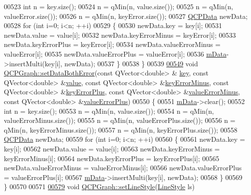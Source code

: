 \begin{DoxyCode}
00523   \textcolor{keywordtype}{int} n = key.size();
00524   n = qMin(n, value.size());
00525   n = qMin(n, valueError.size());
00526   n = qMin(n, keyError.size());
00527   \hyperlink{a00030_d2/d94/a00184}{QCPData} newData;
00528   \textcolor{keywordflow}{for} (\textcolor{keywordtype}{int} i=0; i<n; ++i)
00529   \{
00530     newData.key = key[i];
00531     newData.value = value[i];
00532     newData.keyErrorMinus = keyError[i];
00533     newData.keyErrorPlus = keyError[i];
00534     newData.valueErrorMinus = valueError[i];
00535     newData.valueErrorPlus = valueError[i];
00536     \hyperlink{a00031_a8457c840f69a0ac49f61d30a509c5d08}{mData}->insertMulti(key[i], newData);
00537   \}
00538 \}
00539 
\hypertarget{a00115_source_l00549}{}\hyperlink{a00031_abb75736ecdbf6e6a7501e1da64fb18cf}{00549} \textcolor{keywordtype}{void} \hyperlink{a00031_a873fe46bdb20be5710428e474ade8908}{QCPGraph::setDataBothError}(\textcolor{keyword}{const} QVector<double> &
      \hyperlink{a00116_a94bb892c30911cd62cba0707a5395be4}{key}, \textcolor{keyword}{const} QVector<double> &\hyperlink{a00116_aee90379adb0307effb138f4871edbc5c}{value}, \textcolor{keyword}{const} QVector<double> &\hyperlink{a00116_a7d90a6258f6d24ad254245076e5beac7}{keyErrorMinus}, \textcolor{keyword}{const} 
      QVector<double> &\hyperlink{a00116_a1d47938cd7209297ef861cf01816d89f}{keyErrorPlus}, \textcolor{keyword}{const} QVector<double> &\hyperlink{a00116_aea31bce613e569fc5e1888465c677909}{valueErrorMinus}, \textcolor{keyword}{const} 
      QVector<double> &\hyperlink{a00116_a6d93a38079a2b52118982e82673e87a3}{valueErrorPlus})
00550 \{
00551   \hyperlink{a00031_a8457c840f69a0ac49f61d30a509c5d08}{mData}->clear();
00552   \textcolor{keywordtype}{int} n = key.size();
00553   n = qMin(n, value.size());
00554   n = qMin(n, valueErrorMinus.size());
00555   n = qMin(n, valueErrorPlus.size());
00556   n = qMin(n, keyErrorMinus.size());
00557   n = qMin(n, keyErrorPlus.size());
00558   \hyperlink{a00030_d2/d94/a00184}{QCPData} newData;
00559   \textcolor{keywordflow}{for} (\textcolor{keywordtype}{int} i=0; i<n; ++i)
00560   \{
00561     newData.key = key[i];
00562     newData.value = value[i];
00563     newData.keyErrorMinus = keyErrorMinus[i];
00564     newData.keyErrorPlus = keyErrorPlus[i];
00565     newData.valueErrorMinus = valueErrorMinus[i];
00566     newData.valueErrorPlus = valueErrorPlus[i];
00567     \hyperlink{a00031_a8457c840f69a0ac49f61d30a509c5d08}{mData}->insertMulti(key[i], newData);
00568   \}
00569 \}
00570 
00571 
\hypertarget{a00115_source_l00579}{}\hyperlink{a00031_a513fecccff5b2a50ce53f665338c60ff}{00579} \textcolor{keywordtype}{void} \hyperlink{a00031_a513fecccff5b2a50ce53f665338c60ff}{QCPGraph::setLineStyle}(\hyperlink{a00031_ad60175cd9b5cac937c5ee685c32c0859}{LineStyle} ls)

\end{DoxyCode}

